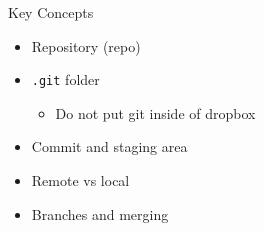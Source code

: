 \documentclass[12pt,t]{beamer}
\begin{document}
\begin{frame}{Key Concepts}
\begin{itemize}
    \item Repository (repo)
		\pause
		\vspace{1em}
    \item \texttt{.git} folder
		\pause
		\begin{itemize}
			\item Do not put git inside of dropbox
		\end{itemize}
		\pause
		\vspace{1em}
    \item Commit and staging area
		\pause
		\vspace{1em}
	\item Remote vs local
		\pause
		\vspace{1em}
    \item Branches and merging
\end{itemize}
\end{frame}


\end{document}
